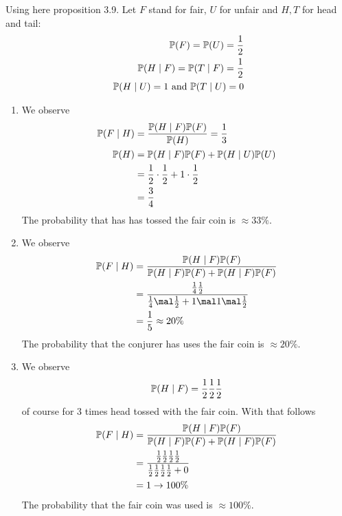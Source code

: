 \begin{solution}
	Using here proposition 3.9.
	Let $F$ stand for fair, $U$ for unfair and $H, T$ for head and tail:
	\begin{align*}
		\mathbb{P}(F) = \mathbb{P}(U) = \frac{1}{2}\\
		\mathbb{P}(H \mid F) = \mathbb{P}(T \mid F) = \frac{1}{2}\\
		\mathbb{P}(H \mid U) = 1 \text{ and } \mathbb{P}(T \mid U) = 0
	\end{align*}
	\begin{enumerate}
		\item We observe
		\begin{align*}
			\mathbb{P}(F \mid H) &= \frac{\mathbb{P}(H \mid F)\mathbb{P}(F)}{\mathbb{P}(H)} = \frac{1}{3}\\
			\mathbb{P}(H) &= \mathbb{P}(H \mid F)\mathbb{P}(F) + \mathbb{P}(H \mid U)\mathbb{P}(U)\\
			&= \frac{1}{2} \cdot \frac{1}{2} + 1 \cdot \frac{1}{2}\\
			&= \frac{3}{4}
		\end{align*}
		The probability that has has tossed the fair coin is $\approx 33\%$.
		\item We observe
		\begin{align*}
			\meas(F\mid H) &= \frac{\meas(H \mid F)\meas(F)}{\meas(H\mid F)\meas(F) + \meas(H \mid F)\meas(F)}\\
			&= \frac{\frac{1}{4}\frac{1}{2}}{\frac{1}{4}\mal \frac{1}{2} + 1 \mal 1 \mal \frac{1}{2}}\\
			&= \frac{1}{5} \approx 20\%
		\end{align*}
		The probability that the conjurer has uses the fair coin is $\approx 20 \%$.
		\item We observe
		\begin{align*}
			\mathbb{P}(H \mid F) = \frac{1}{2}\frac{1}{2}\frac{1}{2}
		\end{align*}
		of course for 3 times head tossed with the fair coin. With that follows
		\begin{align*}
			\mathbb{P}(F \mid H) 
			&= \frac{\mathbb{P}(H \mid F)\mathbb{P}(F)}{\mathbb{P}(H \mid F)\mathbb{P}(F) + \mathbb{P}(H \mid F)\mathbb{P}(F)}\\
			&= \frac{\frac{1}{2}\frac{1}{2}\frac{1}{2}\frac{1}{2}}{\frac{1}{2}\frac{1}{2}\frac{1}{2}\frac{1}{2} + 0}\\
			&= 1 \rightarrow 100\%
		\end{align*}
		The probability that the fair coin was used is $\approx 100\%$.
	\end{enumerate}
\end{solution}
